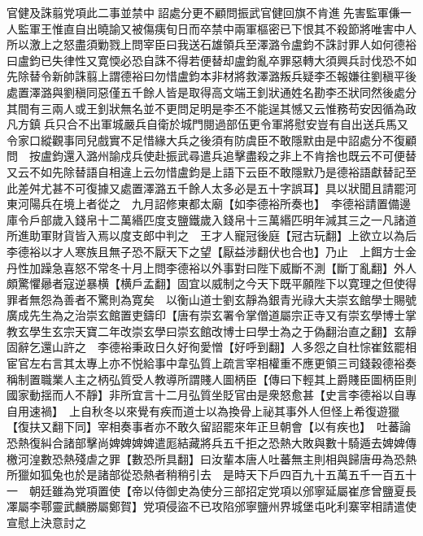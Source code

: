 官健及誅翦党項此二事並禁中詔處分更不顧問振武官健回旗不肯進先害監軍傔一人監軍王惟直自出曉諭又被傷痍旬日而卒禁中兩軍樞密已下恨其不殺節將唯害中人所以激上之怒盡須勦戮上問宰臣曰我送石雄領兵至澤潞令盧鈞不誅討罪人如何德裕曰盧鈞已失律性又寛愞必恐自誅不得若便替却盧鈞亂卒罪惡轉大須興兵討伐恐不如先除替令新帥誅翦上謂德裕曰勿惜盧鈞本非材將救澤潞叛兵疑李丕報嫌往劉稹平後處置澤潞與劉稹同惡僅五千餘人皆是取得高文端王釗狀通姓名勘李丕狀同然後處分其間有三兩人或王釗狀無名並不更問足明是李丕不能逞其憾又云惟務苟安因循為政凡方鎮兵只合不出軍城嚴兵自衛於城門閱過部伍更令軍將慰安豈有自出送兵馬又令家口縱觀事同兒戲實不足惜緣大兵之後須有防虞臣不敢隱默由是中詔處分不復顧問　按盧鈞還入潞州諭戍兵使赴振武尋遣兵追擊盡殺之非上不肯捨也既云不可便替又云不如先除替語自相違上云勿惜盧鈞是上語下云臣不敢隱默乃是德裕語獻替記至此差舛尤甚不可復據又處置澤潞五千餘人太多必是五十字誤耳】具以狀聞且請罷河東河陽兵在境上者從之　九月詔修東都太廟【如李德裕所奏也】　李德裕請置備邊庫令戶部歲入錢帛十二萬緡匹度支鹽鐵歲入錢帛十三萬緡匹明年減其三之一凡諸道所進助軍財貨皆入焉以度支郎中判之　王才人寵冠後庭【冠古玩翻】上欲立以為后李德裕以才人寒族且無子恐不厭天下之望【厭益涉翻伏也合也】乃止　上餌方士金丹性加躁急喜怒不常冬十月上問李德裕以外事對曰陛下威斷不測【斷丁亂翻】外人頗驚懼曏者寇逆暴横【横戶孟翻】固宜以威制之今天下既平願陛下以寛理之但使得罪者無怨為善者不驚則為寛矣　以衡山道士劉玄靜為銀青光祿大夫崇玄館學士賜號廣成先生為之治崇玄館置吏鑄印【唐有崇玄署令掌僧道屬宗正寺又有崇玄學博士掌教玄學生玄宗天寶二年改崇玄學曰崇玄館改博士曰學士為之于偽翻治直之翻】玄靜固辭乞還山許之　李德裕秉政日久好徇愛憎【好呼到翻】人多怨之自杜悰崔鉉罷相宦官左右言其太專上亦不悦給事中韋弘質上疏言宰相權重不應更領三司錢穀德裕奏稱制置職業人主之柄弘質受人教導所謂賤人圖柄臣【傳曰下輕其上爵賤臣圖柄臣則國家動揺而人不靜】非所宜言十二月弘質坐貶官由是衆怒愈甚【史言李德裕以自專自用速禍】　上自秋冬以來覺有疾而道士以為換骨上祕其事外人但怪上希復遊獵【復扶又翻下同】宰相奏事者亦不敢久留詔罷來年正旦朝會【以有疾也】　吐蕃論恐熱復糾合諸部擊尚婢婢婢婢遣厖結藏將兵五千拒之恐熱大敗與數十騎遁去婢婢傳檄河湟數恐熱殘虐之罪【數恐所具翻】曰汝輩本唐人吐蕃無主則相與歸唐毋為恐熱所獵如狐兔也於是諸部從恐熱者稍稍引去　是時天下戶四百九十五萬五千一百五十一　朝廷雖為党項置使【帝以侍御史為使分三部招定党項以邠寧延屬崔彦曾鹽夏長凙屬李鄠靈武麟勝屬鄭賀】党項侵盜不已攻陷邠寧鹽州界城堡屯叱利寨宰相請遣使宣慰上決意討之


